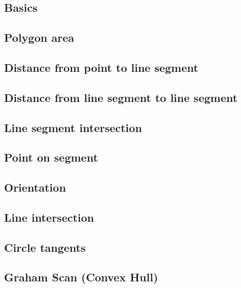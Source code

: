 \documentclass{article}
\begin{document}
	\subsection{Basics}
	

	\subsection{Polygon area}
	
	
	\newpage
	\subsection{Distance from point to line segment}
	

	\subsection{Distance from line segment to line segment}
	

	\subsection{Line segment intersection}
	

	\subsection{Point on segment}
	

	\subsection{Orientation}
	

	\subsection{Line intersection}
	

	\subsection{Circle tangents}
	

	\newpage
	\subsection{Graham Scan (Convex Hull)}
	
\end{document}
